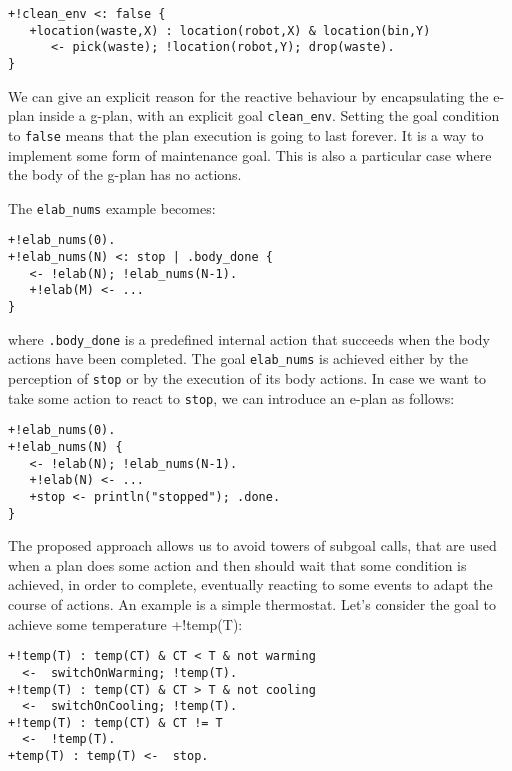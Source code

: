 \begin{small}
\begin{verbatim}
+!clean_env <: false {
   +location(waste,X) : location(robot,X) & location(bin,Y)
      <- pick(waste); !location(robot,Y); drop(waste).
}
\end{verbatim}
\end{small}

\noindent We can give an explicit reason for the reactive behaviour by encapsulating the e-plan inside a g-plan, with an explicit goal \texttt{clean\_env}.
%
Setting the goal condition to \texttt{false} means that the plan
execution is going to last forever. It is a way to implement some form
of maintenance goal.
%
This is also a particular case where the body of the g-plan has no actions.
%

The \texttt{elab\_nums} example becomes:

{\small
\begin{verbatim}
+!elab_nums(0).
+!elab_nums(N) <: stop | .body_done {
   <- !elab(N); !elab_nums(N-1).	
   +!elab(M) <- ...
}
\end{verbatim}}

\noindent where \texttt{.body\_done} is a predefined internal action that succeeds when the body actions have been completed. The goal \texttt{elab\_nums} is achieved either by the perception of \texttt{stop} or by the execution of its body actions.
%
In case we want to take some action to react to \texttt{stop}, we can introduce an e-plan as follows:

{\small
\begin{verbatim}
+!elab_nums(0).
+!elab_nums(N) {
   <- !elab(N); !elab_nums(N-1).
   +!elab(N) <- ...
   +stop <- println("stopped"); .done.
}
\end{verbatim}}

  \bigskip The proposed approach allows us to avoid towers of subgoal
  calls, that are used when a plan does some action and then should
  wait that some condition is achieved, in order to complete,
  eventually reacting to some events to adapt the course of actions.
%
An example is a simple thermostat. 
%
Let's consider the goal to achieve some temperature +!temp(T):

{\small
\begin{verbatim}
+!temp(T) : temp(CT) & CT < T & not warming
  <-  switchOnWarming; !temp(T).
+!temp(T) : temp(CT) & CT > T & not cooling
  <-  switchOnCooling; !temp(T).
+!temp(T) : temp(CT) & CT != T 
  <-  !temp(T).
+temp(T) : temp(T) <-  stop.
\end{verbatim}}

